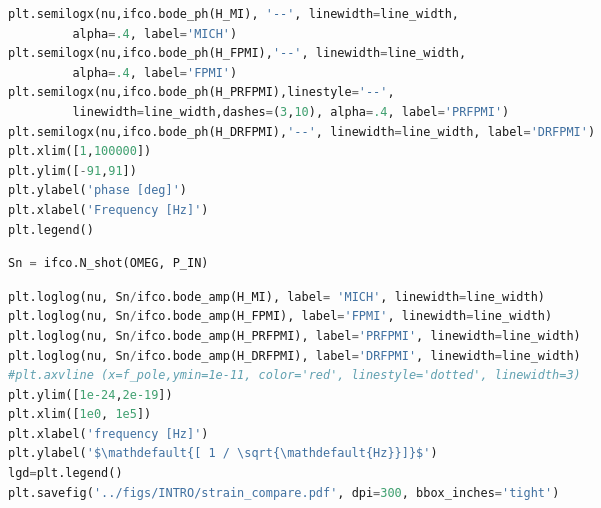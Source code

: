 \begin{spacing}{1}\begin{lstlisting}[frame=single, language=Python]
plt.semilogx(nu,ifco.bode_ph(H_MI), '--', linewidth=line_width, 
	     alpha=.4, label='MICH')
plt.semilogx(nu,ifco.bode_ph(H_FPMI),'--', linewidth=line_width, 
	     alpha=.4, label='FPMI')
plt.semilogx(nu,ifco.bode_ph(H_PRFPMI),linestyle='--', 
	     linewidth=line_width,dashes=(3,10), alpha=.4, label='PRFPMI')
plt.semilogx(nu,ifco.bode_ph(H_DRFPMI),'--', linewidth=line_width, label='DRFPMI')
plt.xlim([1,100000])
plt.ylim([-91,91])
plt.ylabel('phase [deg]')
plt.xlabel('Frequency [Hz]')
plt.legend()
\end{lstlisting}\end{spacing}

\begin{spacing}{1}\begin{lstlisting}[frame=single, language=Python]
Sn = ifco.N_shot(OMEG, P_IN)
\end{lstlisting}\end{spacing}

\begin{spacing}{1}\begin{lstlisting}[frame=single, language=Python]
plt.loglog(nu, Sn/ifco.bode_amp(H_MI), label= 'MICH', linewidth=line_width)
plt.loglog(nu, Sn/ifco.bode_amp(H_FPMI), label='FPMI', linewidth=line_width)
plt.loglog(nu, Sn/ifco.bode_amp(H_PRFPMI), label='PRFPMI', linewidth=line_width)
plt.loglog(nu, Sn/ifco.bode_amp(H_DRFPMI), label='DRFPMI', linewidth=line_width)
#plt.axvline (x=f_pole,ymin=1e-11, color='red', linestyle='dotted', linewidth=3)
plt.ylim([1e-24,2e-19])
plt.xlim([1e0, 1e5])
plt.xlabel('frequency [Hz]')
plt.ylabel('$\mathdefault{[ 1 / \sqrt{\mathdefault{Hz}}]}$')
lgd=plt.legend()
plt.savefig('../figs/INTRO/strain_compare.pdf', dpi=300, bbox_inches='tight')
\end{lstlisting}\end{spacing}

